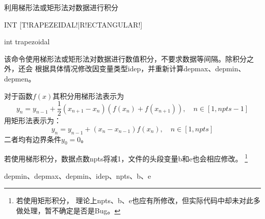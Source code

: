 \label{cmd:int}

利用梯形法或矩形法对数据进行积分

\begin{SACSTX}
INT [T!RAPEZEIDAL!|R!ECTANGULAR!]
\end{SACSTX}

\begin{SACDFT}
int trapezoidal
\end{SACDFT}

该命令使用梯形法或矩形法对数据进行数值积分，不要求数据等间隔。除积分之外，还会
根据具体情况修改因变量类型idep，并重新计算depmax、depmin、depmen。

对于函数$f(x)$其积分用梯形法表示为
\[
    y_n = y_{n-1} + \frac{1}{2}(x_{n+1}-x_n) (f(x_n)+f(x_{n+1})), \quad n\in[1,npts-1]
\]
用矩形法表示为：
\[
    y_n = y_{n-1} + (x_n-x_{n-1})f(x_n), \quad n\in[1,npts]
\]
二者均有边界条件$y_0=0$。

若使用梯形积分，数据点数npts将减1，文件的头段变量b和e也会相应修改。
\footnote{若使用矩形积分，
理论上npts、b、e也应有所修改，但实际代码中却未对此多做处理，暂不确定是否是Bug。}

depmin、depmax、depmin、idep、npts、b、e
